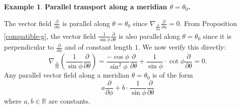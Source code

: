 \documentclass{amsart}
\numberwithin{equation}{section}
\newcommand{\bR}{\mathbb{R}}
\theoremstyle{definition}
\newtheorem{example}[definition]{Example}
\theoremstyle{theorem}
\begin{document}
\begin{example}
\noindent
{\bf Parallel transport along a meridian $\theta=\theta_0$.}

The vector field $\frac{\partial}{\partial \phi}$ is parallel along  $\theta=\theta_0$
since $\nabla_{\frac{\partial}{\partial \phi} }\frac{\partial}{\partial \phi} =0$. 
From Proposition \ref{compatible-g}, the vector field 
$\frac{1}{\sin \phi}\frac{\partial}{\partial \theta}$ 
is also parallel along $\theta=\theta_0$ since it is perpendicular to $\frac{\partial}{\partial \phi}$
and of constant length $1$. We now verify this directly:
$$
\nabla_{\frac{\partial}{\partial \phi}} (\frac{1}{\sin \phi} \frac{\partial}{\partial\theta})
=\frac{-\cos\phi}{\sin^2\phi} \frac{\partial}{\partial \theta}
+\frac{1}{\sin\phi}\cdot \cot \phi\frac{\partial}{\partial \theta}=0.
$$
Any parallel vector field along a meridian $\theta=\theta_0$ is of the form
$$
a \frac{\partial}{\partial \phi} + b\cdot \frac{1}{\sin\phi}\frac{\partial}{\partial \theta}
$$
where $a,b\in \bR$ are constants.


\end{example}
\end{document}

